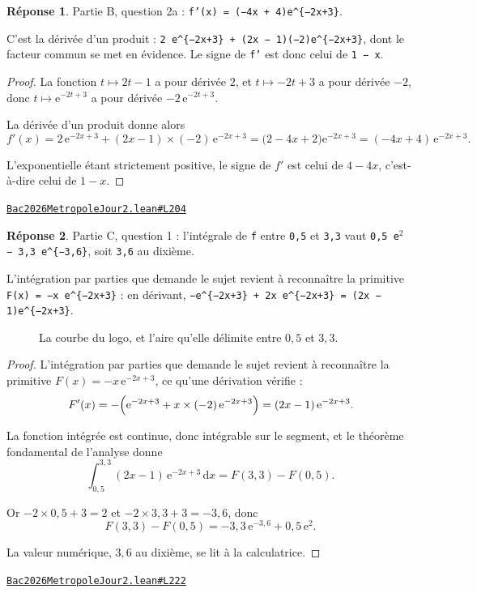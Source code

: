\documentclass[11pt,a4paper]{article}
\theoremstyle{definition}
\theoremstyle{plain}
\theoremstyle{definition}
\newtheorem*{reponse}{Réponse}
\newcommand{\source}[2]{\par\smallskip\noindent\hfill{\footnotesize\href{#1}{\texttt{#2}}}\par\smallskip}
\begin{document}
\begin{reponse}
Partie B, question 2a : \texttt{f'(x) = (−4x + 4)e\textasciicircum{}\{−2x+3\}}.

C'est la dérivée d'un produit : \texttt{2 e\textasciicircum{}\{−2x+3\} + (2x − 1)(−2)e\textasciicircum{}\{−2x+3\}}, dont le facteur
commun se met en évidence. Le signe de \texttt{f'} est donc celui de \texttt{1 − x}.
\end{reponse}
\begin{proof}
La fonction $t \mapsto 2t - 1$ a pour dérivée $2$, et $t \mapsto -2t + 3$ a pour dérivée
$-2$, donc $t \mapsto \mathrm{e}^{-2t+3}$ a pour dérivée $-2\,\mathrm{e}^{-2t+3}$.

La dérivée d'un produit donne alors
\[ f'(x) = 2\,\mathrm{e}^{-2x+3} + (2x - 1) \times (-2)\,\mathrm{e}^{-2x+3}
   = \bigl(2 - 4x + 2\bigr)\mathrm{e}^{-2x+3}
   = (-4x + 4)\,\mathrm{e}^{-2x+3} . \]

L'exponentielle étant strictement positive, le signe de $f'$ est celui de $4 - 4x$,
c'est-à-dire celui de $1 - x$.
\end{proof}
\source{https://github.com/Commutator-IO/learn-lean/blob/main/exams/2026/Bac2026MetropoleJour2.lean\#L204}{Bac2026MetropoleJour2.lean\#L204}

\begin{reponse}
Partie C, question 1 : l'intégrale de \texttt{f} entre \texttt{0,5} et \texttt{3,3} vaut
\texttt{0,5 e\(^{2}\) − 3,3 e\textasciicircum{}\{−3,6\}}, soit \texttt{3,6} au dixième.

L'intégration par parties que demande le sujet revient à reconnaître la primitive
\texttt{F(x) = −x e\textasciicircum{}\{−2x+3\}} : en dérivant, \texttt{−e\textasciicircum{}\{−2x+3\} + 2x e\textasciicircum{}\{−2x+3\} = (2x − 1)e\textasciicircum{}\{−2x+3\}}.
\end{reponse}

\begin{figure}[h]
\centering

\caption{La courbe du logo, et l'aire qu'elle délimite entre \(0{,}5\) et \(3{,}3\).}
\end{figure}
\begin{proof}
L'intégration par parties que demande le sujet revient à reconnaître la primitive
$F(x) = -x\,\mathrm{e}^{-2x+3}$, ce qu'une dérivation vérifie :
\[ F'(x) = -\Bigl(\mathrm{e}^{-2x+3} + x \times (-2)\,\mathrm{e}^{-2x+3}\Bigr)
   = (2x - 1)\,\mathrm{e}^{-2x+3} . \]

La fonction intégrée est continue, donc intégrable sur le segment, et le théorème
fondamental de l'analyse donne
\[ \int_{0{,}5}^{3{,}3} (2x - 1)\,\mathrm{e}^{-2x+3}\,\mathrm{d}x = F(3{,}3) - F(0{,}5) . \]

Or $-2 \times 0{,}5 + 3 = 2$ et $-2 \times 3{,}3 + 3 = -3{,}6$, donc
\[ F(3{,}3) - F(0{,}5) = -3{,}3\,\mathrm{e}^{-3{,}6} + 0{,}5\,\mathrm{e}^{2} . \]

La valeur numérique, $3{,}6$ au dixième, se lit à la calculatrice.
\end{proof}
\source{https://github.com/Commutator-IO/learn-lean/blob/main/exams/2026/Bac2026MetropoleJour2.lean\#L222}{Bac2026MetropoleJour2.lean\#L222}
\end{document}
